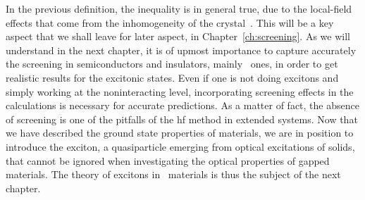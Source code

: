 In the previous definition, the inequality is in general true, due to the local-field effects that come from the inhomogeneity of the crystal~\cite{Rubio_2002}.
This will be a key aspect that we shall leave for later aspect, in Chapter~\ref{ch:screening}.
As we will understand in the next chapter, it is of upmost importance to capture accurately the screening in semiconductors and insulators, mainly \bd~ones, in order to get realistic results for the excitonic states.
Even if one is not doing excitons and simply working at the noninteracting level, incorporating screening effects in the calculations is necessary for accurate predictions.
As a matter of fact, the absence of screening is one of the pitfalls of the \gls{hf} method in extended systems.
Now that we have described the ground state properties of materials, we are in position to introduce the exciton, a quasiparticle emerging from optical excitations of solids, that cannot be ignored when investigating the optical properties of gapped materials.
The theory of excitons in \bd~materials is thus the subject of the next chapter.